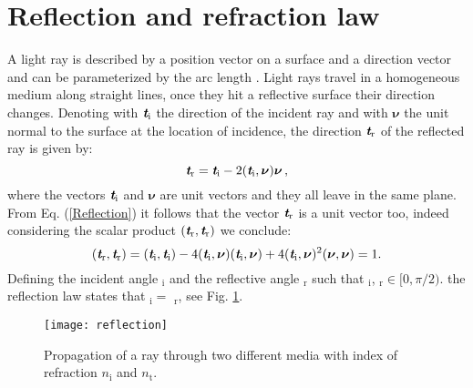 \section{Reflection and refraction law}
A light ray is described by a position vector  on a surface and a direction vector  and can be parameterized by the arc length .
Light rays travel in a homogeneous medium along straight lines, once they hit a reflective surface their direction changes.
 Denoting with $\textit{\textbf{t}}_\textrm{i}$ the direction of the incident ray and with $\boldsymbol{\nu}$ the unit normal to the surface at the location of incidence, the direction $\textit{\textbf{t}}_\textrm{r}$ of the reflected ray is given by:
 \begin{equation}\label{Reflection}
  \textit{\textbf{t}}_\textrm{r} = \textit{\textbf{t}}_\textrm{i}-2(\textit{\textbf{t}}_\textrm{i},\boldsymbol{\nu})\boldsymbol{\nu}\,,
\end{equation}
where the vectors $\textit{\textbf{t}}_\textrm{i}$ and $\boldsymbol{\nu}$ are unit vectors and they all leave in the same plane. 
From Eq. (\ref{Reflection}) it follows that the vector  $\textit{\textbf{t}}_\textrm{r}$ is a unit vector too, indeed considering the scalar product $(\textit{\textbf{t}}_\textrm{r},\textit{\textbf{t}}_\textrm{r})$ we conclude:
\begin{equation}\label{unit_vector}
(\textit{\textbf{t}}_\textrm{r},\textit{\textbf{t}}_\textrm{r}) = (\textit{\textbf{t}}_\textrm{i},\textit{\textbf{t}}_\textrm{i}) - 4(\textit{\textbf{t}}_\textrm{i},\boldsymbol{\nu})(\textit{\textbf{t}}_\textrm{i},\boldsymbol{\nu})+
4(\textit{\textbf{t}}_\textrm{i},\boldsymbol{\nu})^2(\boldsymbol{\nu},\boldsymbol{\nu})=1 .
\end{equation} 
Defining the incident angle \myangle$_\textrm{i}$ and the reflective angle \myangle$_\textrm{r}$ such that \myangle$_\textrm{i}$, \myangle$_\textrm{r} \in[0, \pi/2)$.
the reflection law states that \myangle$_\textrm{i}=$ \myangle$_\textrm{r}$, see Fig. \ref{fig:Snell}.
\begin{figure}[h]
 \label{fig:Snell}
     \begin{center}
     \texttt{[image: reflection]}
     \end{center}
     \caption{Propagation of a ray through two different media with index of refraction $n_\textrm{i}$ and $n_\textrm{t}$.}%
\label{fig:Snell}
 \end{figure}
